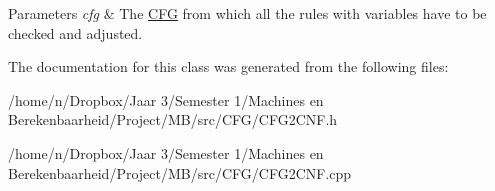 \begin{DoxyParams}{\-Parameters}
{\em cfg} & \-The \hyperlink{class_c_f_g}{\-C\-F\-G} from which all the rules with variables have to be checked and adjusted. \\
\hline
\end{DoxyParams}


\-The documentation for this class was generated from the following files\-:\begin{DoxyCompactItemize}
\item 
/home/n/\-Dropbox/\-Jaar 3/\-Semester 1/\-Machines en Berekenbaarheid/\-Project/\-M\-B/src/\-C\-F\-G/\-C\-F\-G2\-C\-N\-F.\-h\item 
/home/n/\-Dropbox/\-Jaar 3/\-Semester 1/\-Machines en Berekenbaarheid/\-Project/\-M\-B/src/\-C\-F\-G/\-C\-F\-G2\-C\-N\-F.\-cpp\end{DoxyCompactItemize}
